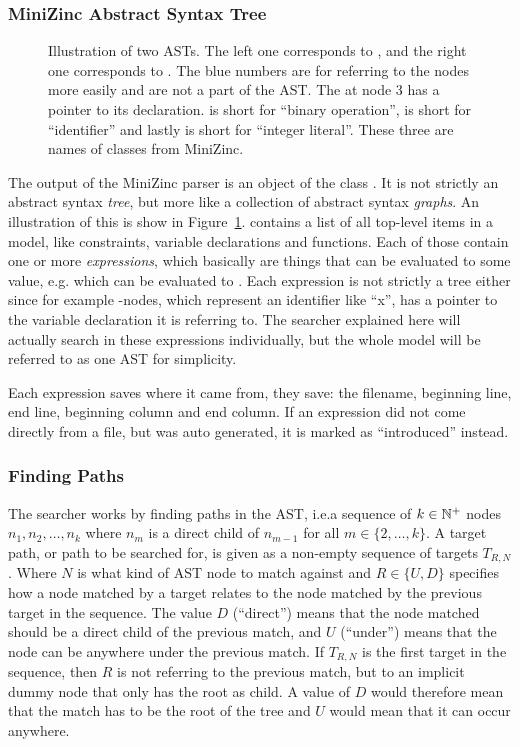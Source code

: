 \documentclass[a4paper,12pt]{article}
\begin{document}
\subsubsection{MiniZinc Abstract Syntax Tree}
\begin{figure}[ht]
  \centering
  \newif\ifshowastnumbers\showastnumberstrue
  
  \caption{Illustration of two ASTs. The left one corresponds to ,
    and the right one corresponds to . The blue numbers are
    for referring to the nodes more easily and are not a part of the AST. The  at
    node 3 has a pointer to its declaration.  is short for ``binary operation'',
     is short for ``identifier'' and lastly  is short for ``integer
    literal''. These three are names of classes from MiniZinc.}%
  \label{fig:ast:searcher}
\end{figure}

The output of the MiniZinc parser is an object of the class . It is not strictly
an abstract syntax \emph{tree}, but more like a collection of abstract syntax
\emph{graphs}. An illustration of this is show in Figure~\ref{fig:ast:searcher}.
 contains a list of all top-level items in a model, like constraints, variable
declarations and functions. Each of those contain one or more \emph{expressions}, which
basically are things that can be evaluated to some value, e.g.\@ {} which can be
evaluated to . Each expression is not strictly a tree either since for example
-nodes, which represent an identifier like ``x'', has a pointer to the variable
declaration it is referring to. The searcher explained here will actually search in these
expressions individually, but the whole model will be referred to as one AST for
simplicity.

Each expression saves where it came from, they save: the filename, beginning line, end
line, beginning column and end column. If an expression did not come directly from a file,
but was auto generated, it is marked as ``introduced'' instead.

\subsubsection{Finding Paths}\label{sec:paths}
The searcher works by finding paths in the AST, i.e.\@ a sequence of $k \in \mathbb{N}^+$
nodes $n_1, n_2, \dots ,n_k$ where $n_m$ is a direct child of $n_{m-1}$ for
all $m \in \{2,\dots,k\}$. A target path, or path to be searched for, is given as a
non-empty sequence of targets $T_{R,N}$. Where $N$ is what kind of AST node to match
against and $R \in \{U,D\}$ specifies how a node matched by a target relates to the node
matched by the previous target in the sequence. The value $D$ (``direct'') means that the
node matched should be a direct child of the previous match, and $U$ (``under'') means
that the node can be anywhere under the previous match. If $T_{R,N}$ is the first target
in the sequence, then $R$ is not referring to the previous match, but to an implicit dummy node
that only has the root as child.
A value of $D$ would therefore mean that the match has to be the root of the tree and $U$ would mean
that it can occur anywhere.
\end{document}
